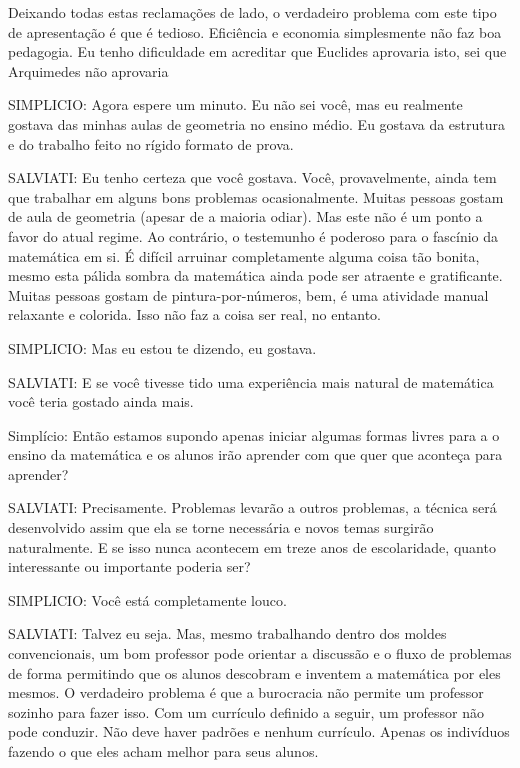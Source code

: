 \documentclass[a4paper,oneside,10pt,notitlepage]{article}
\begin{document}












Deixando todas estas reclamações de lado, o verdadeiro problema com este tipo de apresentação é que é tedioso. Eficiência e economia simplesmente não faz boa pedagogia. Eu tenho dificuldade em acreditar que Euclides aprovaria isto, sei que Arquimedes não aprovaria 

SIMPLICIO: Agora espere um minuto. Eu não sei você, mas eu realmente gostava das minhas aulas de geometria no ensino médio. Eu gostava da estrutura e do trabalho feito no rígido formato de prova.

SALVIATI: Eu tenho certeza que você gostava. Você, provavelmente, ainda tem que trabalhar em alguns bons problemas ocasionalmente. Muitas pessoas gostam de aula de geometria (apesar de a maioria odiar). Mas este não é um ponto a favor do atual regime. Ao contrário, o testemunho é poderoso para o fascínio da matemática em si. É difícil arruinar completamente alguma coisa tão bonita, mesmo esta pálida sombra da matemática ainda pode ser atraente e gratificante. Muitas pessoas gostam de pintura-por-números, bem, é uma atividade manual relaxante e colorida. Isso não faz a coisa ser real, no entanto.

SIMPLICIO: Mas eu estou te dizendo, eu gostava. 

SALVIATI: E se você tivesse tido uma experiência mais natural de matemática você teria gostado ainda mais.

Simplício: Então estamos supondo apenas iniciar algumas formas livres para a o ensino da matemática e os alunos irão aprender com que quer que aconteça para aprender? 

SALVIATI: Precisamente. Problemas levarão a outros problemas, a técnica será desenvolvido assim que ela se torne necessária e novos temas surgirão naturalmente. E se isso nunca acontecem em treze anos de escolaridade, quanto interessante ou importante poderia ser? 

SIMPLICIO: Você está completamente louco. 

SALVIATI: Talvez eu seja. Mas, mesmo trabalhando dentro dos moldes convencionais, um bom professor pode orientar a discussão e o fluxo de problemas de forma permitindo que os alunos descobram e inventem a matemática por eles mesmos. O verdadeiro problema é que a burocracia não permite um professor sozinho para fazer isso. Com um currículo definido a seguir, um professor não pode conduzir. Não deve haver padrões e nenhum currículo. Apenas os indivíduos fazendo o que eles acham melhor para seus alunos.
\end{document}
